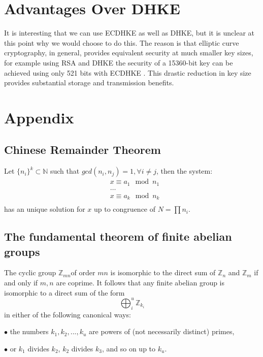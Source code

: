 \documentclass{article}
\theoremstyle{plain}
\theoremstyle{definition}
\begin{document}
\section{Advantages Over DHKE}\label{advantages}

        It is interesting that we can use ECDHKE as well as DHKE, but it is unclear at this point why we would choose to do this.
        The reason is that elliptic curve cryptography, in general, provides equivalent security at much smaller key sizes, for example using RSA and DHKE the security of a 15360-bit key can be achieved using only 521 bits with ECDHKE \cite{nsa}.
        This drastic reduction in key size provides substantial storage and transmission benefits.



        


\section{Appendix}\label{appendix}
\subsection{Chinese Remainder Theorem}
Let $\{n_i\}^k \subset \mathbb{N}$ such that $gcd(n_i,n_j)=1,\forall i\neq j$, then the system:
\begin{align*}
    &x \equiv a_1 \mod n_1\\
    &\dots\\
    &x \equiv a_k \mod n_k\\
\end{align*}
has an unique solution for $x$ up to congruence of $N = \prod n_i$. 

\subsection{The fundamental theorem of finite abelian groups}
The cyclic group $\mathbb{Z}_{mn}$of order $mn$ is isomorphic to the direct sum of $\mathbb{Z}_n$ and $\mathbb{Z}_m$ if and only if $m,n$ are coprime. It follows that any finite abelian group is isomorphic to a direct sum of the form
\[\bigoplus_{i}^{u}\mathbb{Z}_{k_i}\]
in either of the following canonical ways:

\hspace{2em} $\bullet$ the numbers $k_1,k_2,...,k_u$ are powers of (not necessarily distinct) primes,

\hspace{2em} $\bullet$ or $k_1$ divides $k_2$, $k_2$ divides $k_3$, and so on up to $k_u$.
\printbibliography
\end{document}
